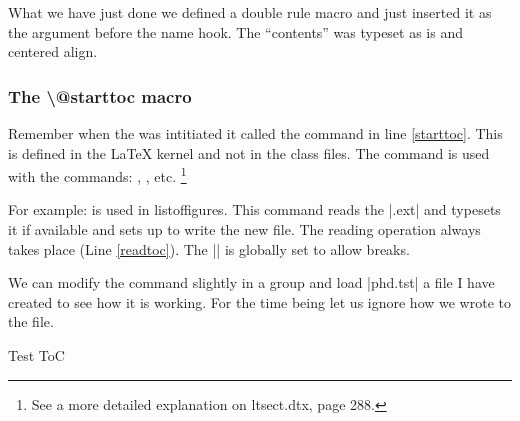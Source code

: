 
What we have just done we defined a double rule macro and just inserted it as the argument before the name hook. The ``contents'' was typeset as is and centered align. 



\subsubsection{The \textbackslash @starttoc macro}

Remember when the \cmd{\tableofcontents} was intitiated it called the \cmd{\@starttoc} command in line \ref{starttoc}. This is defined in the LaTeX kernel and not in the class files. The  command is used with the commands:
, , etc. \footnote{See a more detailed explanation on ltsect.dtx, page 288.}

For example:  is used in listoffigures. This command
reads the |.ext| and typesets it if available and sets up to write the new file. The reading operation always takes place (Line \ref{readtoc}). The |\@nobreakfalse| is globally set to allow breaks. 

\begin{teX}
\def\@starttoc#1{%
\begingroup
  \makeatletter
  \@input{\jobname.#1}%
  \if@filesw
    \expandafter\newwrite\csname tf@#1\endcsname
    \immediate\openout \csname tf@#1\endcsname \jobname.#1\relax
   \fi
   \@nobreakfalse
\endgroup}
\end{teX}

We can modify the command slightly in a group and load |phd.tst| a file I have created to see how it is working. For the time being let us ignore how we wrote to the file.

\begin{texexample}{Test ToC}{}
\makeatletter
{} 
\begingroup
\def\@starttoc#1{
    \@input{\jobname.#1}
    \@nobreakfalse}
\@starttoc{tst}  
\endgroup
\makeatother
\end{texexample}

